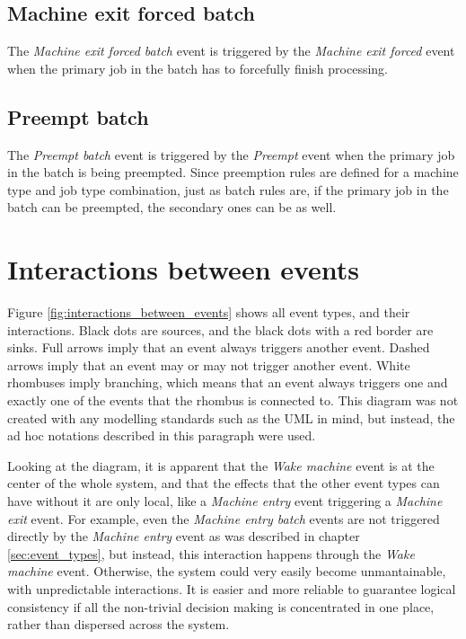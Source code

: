 \subsection{Machine exit forced batch}
The \textit{Machine exit forced batch} event is triggered by the \textit{Machine exit forced} event when the primary job in the batch has to forcefully finish processing.

\subsection{Preempt batch}
The \textit{Preempt batch} event is triggered by the \textit{Preempt} event when the primary job in the batch is being preempted. Since preemption rules are defined for a machine type and job type combination, just as batch rules are, if the primary job in the batch can be preempted, the secondary ones can be as well.

\section{Interactions between events}

Figure \ref{fig:interactions_between_events} shows all event types, and their interactions. Black dots are sources, and the black dots with a red border are sinks. Full arrows imply that an event always triggers another event. Dashed arrows imply that an event may or may not trigger another event. White rhombuses imply branching, which means that an event always triggers one and exactly one of the events that the rhombus is connected to. This diagram was not created with any modelling standards such as the UML in mind, but instead, the ad hoc notations described in this paragraph were used. 

Looking at the diagram, it is apparent that the \textit{Wake machine} event is at the center of the whole system, and that the effects that the other event types can have without it are only local, like a \textit{Machine entry} event triggering a \textit{Machine exit} event. For example, even the \textit{Machine entry batch} events are not triggered directly by the \textit{Machine entry} event as was described in chapter \ref{sec:event_types}, but instead, this interaction happens through the \textit{Wake machine} event. Otherwise, the system could very easily become unmantainable, with unpredictable interactions. It is easier and more reliable to guarantee logical consistency if all the non-trivial decision making is concentrated in one place, rather than dispersed across the system.

